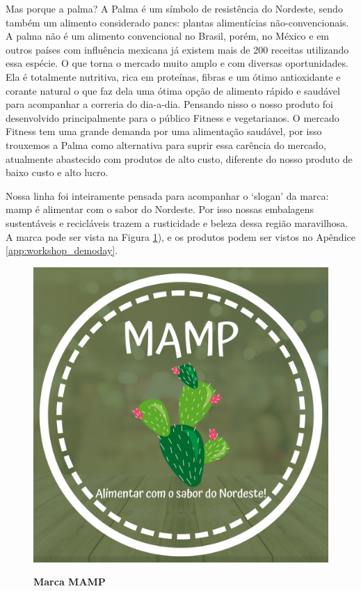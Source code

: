 Mas porque a palma? A Palma é um símbolo de resistência do Nordeste, sendo também um alimento considerado pancs: plantas alimentícias não-convencionais. A palma não é um alimento convencional no Brasil, porém, no México e em outros países com influência mexicana já existem mais de 200 receitas utilizando essa espécie. O que torna o mercado muito amplo e com diversas oportunidades. Ela é totalmente nutritiva, rica em proteínas, fibras e um ótimo antioxidante e corante natural o que faz dela uma ótima opção de alimento rápido e saudável para acompanhar a correria do dia-a-dia.
Pensando nisso o nosso produto foi desenvolvido principalmente para o público Fitness e vegetarianos. O mercado Fitness tem uma grande demanda por uma alimentação saudável, por isso trouxemos a Palma como alternativa para suprir essa carência do mercado, atualmente abastecido com produtos de alto custo, diferente do nosso produto de baixo custo e alto lucro.

Nossa linha foi inteiramente pensada para acompanhar o ‘slogan’ da marca: mamp é alimentar com o sabor do Nordeste. Por isso nossas embalagens sustentáveis e recicláveis trazem a rusticidade e beleza dessa região maravilhosa. A marca pode ser vista na Figura \ref{figura_22}), e os produtos podem ser vistos no Apêndice \ref{app:workshop_demoday}.


\begin{figure}[H]
\centering
\caption{\textbf{Marca MAMP}}
\includegraphics[scale=0.08]{Imagens/mamp.png}
\label{figura_22}
\end{figure}


